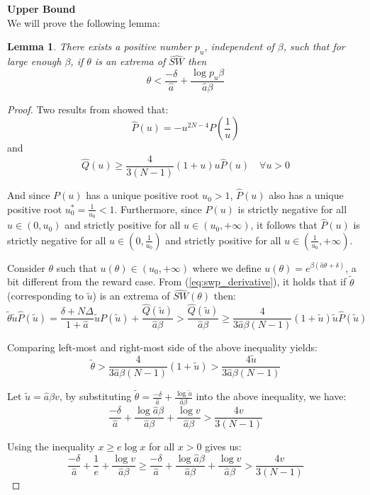 \documentclass{article}
\newtheorem{lemma}{Lemma}
\begin{document}
\textbf{Upper Bound} \\
We will prove the following lemma:
\begin{lemma} \label{lem:}
There exists a positive number $p_u$, independent of $\beta$, such that for large enough $\beta$, if $\theta$ is an extrema of $\widehat{SW}$ then
\[
\theta < \frac{-\delta}{\hat{a}} + \frac{\log p_u \beta}{\hat{a}\beta}
\] \label{lem:upper_bound_punish}
\end{lemma}
\begin{proof}
Two results from \cite{duonghan2021cost} showed that:
\[
\hat{P}(u)= -u^{2N-4} P \left( \frac{1}{u} \right)
\]
and
\[
\hat{Q}(u) \ge \frac{4}{3(N-1)}(1+u)u\hat{P}(u) \quad \forall u >0
\]

And since $P(u)$ has a unique positive root $u_0 > 1$, $\hat{P}(u)$ also has a unique positive root $u^{*}_0 = \frac{1}{u_0} < 1$. Furthermore, since $P(u)$ is strictly negative for all $u \in (0, u_0)$ and strictly positive for all $u \in (u_0, +\infty)$, it follows that $\hat{P}(u)$ is strictly negative for all $u \in (0, \frac{1}{u_0})$ and strictly positive for all $u \in (\frac{1}{u_0}, +\infty)$.

Consider $\theta$ such that $u(\theta) \in (u_0, +\infty)$ where we define $u(\theta) = e^{\beta(\hat{a}\theta + \delta)}$, a bit different from the reward case. From (\ref{eq:swp_derivative}), it holds that if $\tilde{\theta}$ (corresponding to $\tilde{u}$) is an extrema of $\widehat{SW}(\theta)$ then:
\begin{equation}
\tilde{\theta} \tilde{u} \hat{P}(\tilde{u}) = \frac{\delta + N\Delta}{1+\hat{a}}\tilde{u}P(\tilde{u}) + \frac{\hat{Q}(\tilde{u})}{\hat{a}\beta} > \frac{\hat{Q}(\tilde{u})}{\hat{a}\beta} \ge \frac{4}{3\hat{a}\beta(N-1)}(1+\tilde{u})\tilde{u}\hat{P}(\tilde{u}) \label{ineq:extrema_punishment}
\end{equation}

Comparing left-most and right-most side of the above inequality yields:
\[
\tilde{\theta} > \frac{4}{3\hat{a}\beta(N-1)}(1+\tilde{u}) > \frac{4\tilde{u}}{3\hat{a}\beta(N-1)}
\]

Let $\tilde{u} = \hat{a}\beta v$, by substituting $\tilde{\theta} = \frac{-\delta}{\hat{a}} + \frac{\log \tilde{u}}{\hat{a}\beta}$ into the above inequality, we have:
\[
\frac{-\delta}{\hat{a}} + \frac{\log \hat{a}\beta}{\hat{a}\beta} + \frac{\log v}{\hat{a}\beta} > \frac{4 v}{3(N-1)}
\]

Using the inequality $x \ge e \log x$ for all $x > 0$ gives us:
\[
\frac{-\delta}{\hat{a}} + \frac{1}{e} + \frac{\log v}{\hat{a}\beta} \ge \frac{-\delta}{\hat{a}} + \frac{\log \hat{a}\beta}{\hat{a}\beta} + \frac{\log v}{\hat{a}\beta} > \frac{4 v}{3(N-1)}
\]


\end{proof}
\end{document}
